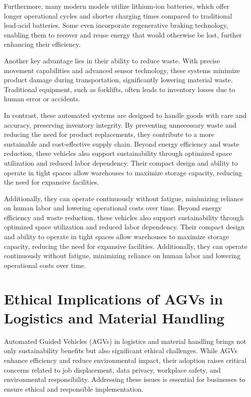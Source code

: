 \documentclass[../../main]{subfiles}
\begin{document}
Furthermore, many modern models utilize lithium-ion batteries, 
which offer longer operational cycles and shorter charging times 
compared to traditional lead-acid batteries. 
Some even incorporate regenerative braking technology, 
enabling them to recover and reuse energy that would otherwise be lost, 
further enhancing their efficiency.

Another key advantage lies in their ability to reduce waste. 
With precise movement capabilities and advanced sensor technology, 
these systems minimize product damage during transportation, 
significantly lowering material waste. 
Traditional equipment, such as forklifts, often leads to inventory losses 
due to human error or accidents. 

In contrast, these automated systems are designed to handle goods 
with care and accuracy, preserving inventory integrity. 
By preventing unnecessary waste and reducing the need for product replacements, 
they contribute to a more sustainable and cost-effective supply chain.
Beyond energy efficiency and waste reduction, 
these vehicles also support sustainability 
through optimized space utilization and reduced labor dependency. 
Their compact design and ability to operate in tight spaces 
allow warehouses to maximize storage capacity, 
reducing the need for expansive facilities. 

Additionally, they can operate continuously without fatigue, 
minimizing reliance on human labor 
and lowering operational costs over time.
Beyond energy efficiency and waste reduction, these vehicles also support sustainability through 
optimized space utilization and reduced labor dependency. Their compact design and ability to operate 
in tight spaces allow warehouses to maximize storage capacity, reducing the need for expansive facilities. 
Additionally, they can operate continuously without fatigue, minimizing reliance on human labor and lowering 
operational costs over time. 

\section{Ethical Implications of AGVs in Logistics and Material Handling}

Automated Guided Vehicles (AGVs) in logistics 
and material handling brings not only sustainability benefits 
but also significant ethical challenges. 
While AGVs enhance efficiency and reduce environmental impact, 
their adoption raises critical concerns related to job displacement, 
data privacy, workplace safety, and environmental responsibility. 
Addressing these issues is essential for businesses 
to ensure ethical and responsible implementation.
\end{document}
